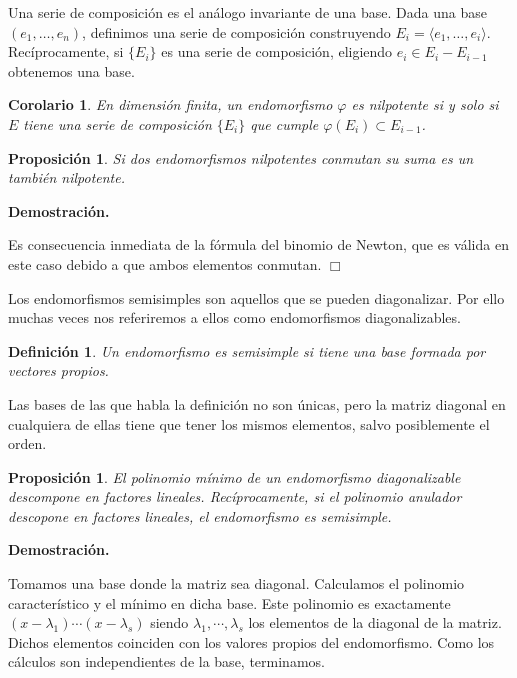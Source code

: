 \documentclass[a4paper,draft,12pt]{article}
\newtheorem{defi}{Definición}[section]%
\newtheorem{propo}[teo]{Proposición}%
\newtheorem{cor}[teo]{Corolario}%
\newcommand{\dem}{\noindent \textbf{Demostración. }\vspace{0.3 cm}}%
\newcommand{\fin}{ $\Box $ \vspace{0.4 cm}}
\newcommand{\df}[1]{\textsf{\color{blue}#1}}
\begin{document}
Una serie de composición es el análogo invariante de una base.  Dada una base $(e_1,\dots,e_n)$, definimos una serie de composición construyendo $E_i= \langle e_1, \dots ,e_i\rangle$.  Recíprocamente, si $\{E_i\}$ es una serie de composición, eligiendo $e_i \in E_i -E_{i-1}$ obtenemos una base.

\begin{cor}

En dimensión finita, un endomorfismo $\varphi$ es nilpotente si y solo si $E$ tiene una serie de composición $\{E_i\}$ que cumple $\varphi(E_i) \subset E_{i-1}$.

\end{cor}

\begin{propo}

Si dos endomorfismos nilpotentes conmutan su suma es un también nilpotente.

\end{propo}

\dem

Es consecuencia inmediata de la fórmula del binomio de Newton, que es válida en este caso debido a que ambos elementos conmutan. \fin


Los endomorfismos semisimples son aquellos que se pueden diagonalizar.  Por ello muchas veces nos referiremos a ellos como endomorfismos diagonalizables.

\begin{defi}

Un endomorfismo es  \df{semisimple}  si tiene una base formada por  vectores propios.

\end{defi}

Las bases de las que habla la definición no son únicas, pero la matriz diagonal en cualquiera de ellas tiene que tener los mismos elementos, salvo posiblemente el orden.

\begin{propo}

El polinomio mínimo de un endomorfismo diagonalizable descompone en factores lineales.  Recíprocamente, si el polinomio anulador descopone en factores lineales, el endomorfismo es semisimple.

\end{propo}

\dem

Tomamos una base donde la matriz sea diagonal.  Calculamos el polinomio característico y el mínimo en dicha base. Este polinomio es exactamente $(x-\lambda_1) \cdots (x-\lambda_s)$ siendo $\lambda_1, \cdots, \lambda_s$ los elementos de la diagonal de la matriz.  Dichos elementos coinciden con los valores propios del endomorfismo.  Como los cálculos son independientes de la base, terminamos.
\end{document}
